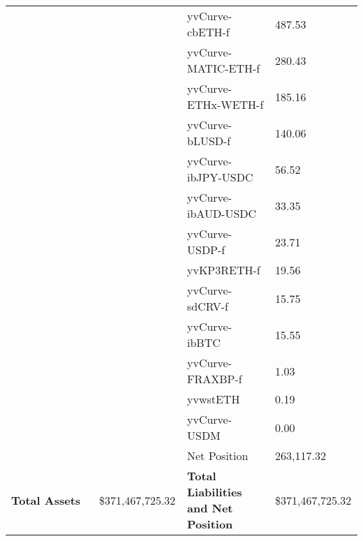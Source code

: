 \begin{longtable}{@{}p{0.25\linewidth}p{0.25\linewidth}p{0.25\linewidth}p{0.25\linewidth}@{}}
 &  & yvCurve-cbETH-f & 487.53 \\
 &  & yvCurve-MATIC-ETH-f & 280.43 \\
 &  & yvCurve-ETHx-WETH-f & 185.16 \\
 &  & yvCurve-bLUSD-f & 140.06 \\
 &  & yvCurve-ibJPY-USDC & 56.52 \\
 &  & yvCurve-ibAUD-USDC & 33.35 \\
 &  & yvCurve-USDP-f & 23.71 \\
 &  & yvKP3RETH-f & 19.56 \\
 &  & yvCurve-sdCRV-f & 15.75 \\
 &  & yvCurve-ibBTC & 15.55 \\
 &  & yvCurve-FRAXBP-f & 1.03 \\
 &  & yvwstETH & 0.19 \\
 &  & yvCurve-USDM & 0.00 \\
 &  & Net Position & 263,117.32 \\

\midrule

\textbf{Total Assets} & \$371,467,725.32 & \textbf{Total Liabilities and Net Position} & \$371,467,725.32 \\

\bottomrule

\end{longtable}

